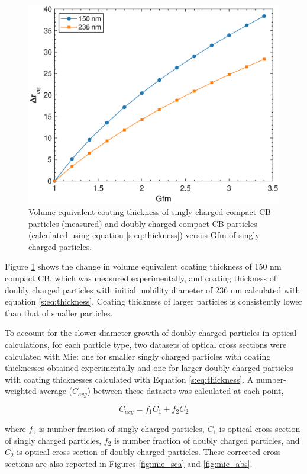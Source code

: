 \documentclass[12pt]{article}
\begin{document}
\begin{figure}[htp]
\centering
\includegraphics[scale=0.7]{images/fig_supp_thickness_formula.eps}
\caption{Volume equivalent coating thickness of singly charged compact CB particles (measured) and doubly charged compact CB particles (calculated using equation \ref{s:eq:thickness}) versus Gfm of singly charged particles.}
\label{s:fig:thickness}
\end{figure}

Figure \ref{s:fig:thickness} shows the change in volume equivalent coating thickness of 150 nm compact CB, which was measured experimentally, and coating thickness of doubly charged particles with initial mobility diameter of 236 nm calculated with equation \ref{s:eq:thickness}. Coating thickness of larger particles is consistently lower than that of smaller particles.

To account for the slower diameter growth of doubly charged particles in optical calculations, for each particle type, two datasets of optical cross sections were calculated with Mie: one for smaller singly charged particles with coating thicknesses obtained experimentally and one for larger doubly charged particles with coating thicknesses calculated with Equation \ref{s:eq:thickness}. A number-weighted average ($C_{avg}$) between these datasets was calculated at each point,

\begin{equation}
    C_{avg}=f_1C_1+f_2C_2
\end{equation}

\noindent where $f_1$ is number fraction of singly charged particles, $C_1$ is optical cross section of singly charged particles, $f_2$ is number fraction of doubly charged particles, and $C_2$ is optical cross section of doubly charged particles. These corrected cross sections are also reported in Figures \ref{fig:mie_sca} and \ref{fig:mie_abs}.
\end{document}
